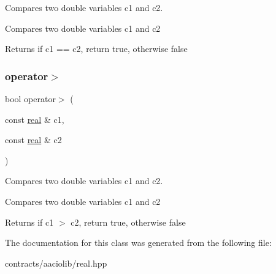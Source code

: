 Compares two double variables c1 and c2. 

Compares two double variables c1 and c2 \begin{DoxyReturn}{Returns}
if c1 == c2, return true, otherwise false 
\end{DoxyReturn}
\mbox{\label{classaacio_1_1real_aef9761f53a00fd4debd021a192449396}} 
\subsubsection{\texorpdfstring{operator$>$}{operator>}}
{\footnotesize\ttfamily bool operator$>$ (\begin{DoxyParamCaption}\item[{const \mbox{\hyperlink{classaacio_1_1real}{real}} \&}]{c1,  }\item[{const \mbox{\hyperlink{classaacio_1_1real}{real}} \&}]{c2 }\end{DoxyParamCaption})\hspace{0.3cm}{\ttfamily [friend]}}



Compares two double variables c1 and c2. 

Compares two double variables c1 and c2 \begin{DoxyReturn}{Returns}
if c1 $>$ c2, return true, otherwise false 
\end{DoxyReturn}


The documentation for this class was generated from the following file\+:\begin{DoxyCompactItemize}
\item 
contracts/aaciolib/real.\+hpp\end{DoxyCompactItemize}
